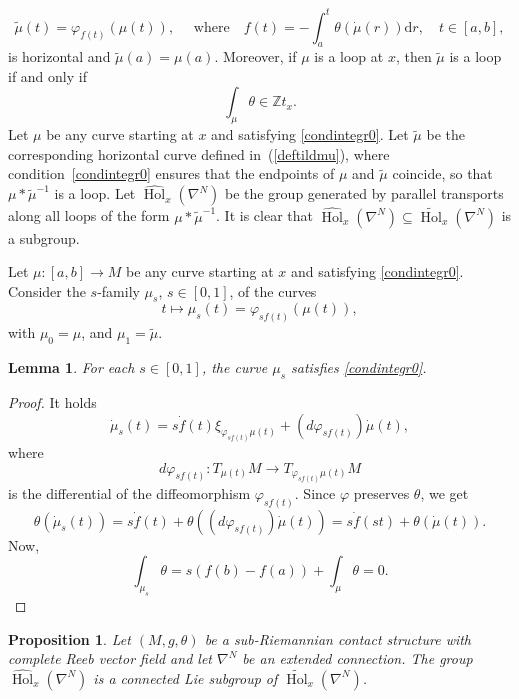 \documentclass{amsart}
\theoremstyle{plain}
\newtheorem{prop}[theorem]{Proposition}
\newtheorem{lem}[theorem]{Lemma}
\theoremstyle{definition}
\newcommand{\Hol}{\operatorname{Hol}}
\newcommand{\1}{\mathbf{1}}
\renewcommand{\d}{\mathrm{d}}
\newcommand{\+}{\oplus}
\begin{document}
\begin{equation}\label{deftildmu}
\tilde \mu(t)=\varphi_{f(t)}(\mu(t)),\quad\text{ 
where}\quad f(t)=-\int_a^t\theta(\dot\mu(r))\d r,\quad  t\in[a,b],\end{equation}
 is horizontal and $\tilde\mu(a)=\mu(a)$. Moreover, if $\mu$ is a loop at $x$, then $\tilde\mu$ is a loop  if and only if 
 	\begin{equation}\label{condintegr}\int_\mu\theta\in \mathbb{Z}t_x.\end{equation}
Let $\mu$ be any curve starting at $x$ and satisfying \eqref{condintegr0}.
	Let $\tilde\mu$ be the corresponding horizontal curve defined in~(\ref{deftildmu}), where condition~\eqref{condintegr0} ensures that the endpoints of $\mu$ and $\tilde \mu$ coincide, so that $\mu*\tilde\mu^{-1}$ is a loop.  Let $\widehat{\Hol}_x(\nabla^N)$ be the group generated by parallel transports along all loops of the form $\mu*\tilde\mu^{-1}$. 
It is clear that $\widehat{\Hol}_x(\nabla^N)\subseteq \widetilde{\Hol}_x(\nabla^N)$ is a subgroup. 

Let $\mu:[a,b]\to M$ be any curve starting at $x$ and satisfying \eqref{condintegr0}.
Consider the $s$-family $\mu_s$, $s\in[0,1]$, of the curves 
 \begin{equation}
\label{mus}
t\longmapsto \mu_s(t)=\varphi_{sf(t)}(\mu(t)),\end{equation}
with $\mu_0=\mu$, and $\mu_1=\tilde\mu$.

\begin{lem}
\label{homotopylem}
	For each $s\in[0,1]$, the curve $\mu_s$ satisfies \eqref{condintegr0}.
\end{lem} 

\begin{proof} It holds $$\dot\mu_s(t)=s\dot f(t) \xi_{\varphi_{sf(t)}\mu(t)}+(d\varphi_{sf(t)})\dot\mu(t),$$ where 
$$d\varphi_{sf(t)}:T_{\mu(t)}M\to T_{\varphi_{sf(t)}\mu(t)}M$$ is the differential of the diffeomorphism $\varphi_{sf(t)}$. Since $\varphi$ preserves $\theta$, we get 
$$\theta(\dot\mu_s(t))=s\dot f(t)+\theta ((d\varphi_{sf(t)})\dot\mu(t))=s\dot f(st)+\theta (\dot\mu(t)).$$ Now, 
$$\int_{\mu_s}\theta=s(f(b)-f(a))+\int_{\mu}\theta=0.$$ \end{proof}

\begin{prop} 
Let $(M,g,\theta)$ be a sub-Riemannian contact structure with complete Reeb vector field and let $\nabla^N$ be an extended connection.
The group $\widehat{\Hol}_x(\nabla^N)$ is a connected Lie subgroup of $\widetilde{\Hol}_x(\nabla^N)$.
\end{prop}
\end{document}
